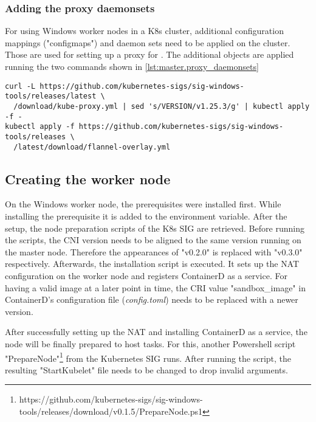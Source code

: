 \subsubsection{Adding the proxy daemonsets}
For using \ac{Windows} worker nodes in a \ac{K8s} cluster, additional configuration mappings ("configmaps") and daemon sets need to be applied on the cluster. Those are used for setting up a proxy for . The additional objects are applied running the two commands shown in \autoref{lst:master.proxy_daemonsets}
\begin{lstlisting}[label=lst:master.proxy_daemonsets, caption={Bash command for adding the flannel overlay configuration\cite{GitHubKubernetesSIGWindowsTools.20230213}}]
curl -L https://github.com/kubernetes-sigs/sig-windows-tools/releases/latest \
  /download/kube-proxy.yml | sed 's/VERSION/v1.25.3/g' | kubectl apply -f -
kubectl apply -f https://github.com/kubernetes-sigs/sig-windows-tools/releases \
  /latest/download/flannel-overlay.yml
\end{lstlisting}

\subsection{Creating the worker node}
On the Windows worker node, the prerequisites were installed first. While installing the prerequisite  it is added to the  environment variable. After the setup, the node preparation scripts of the \ac{K8s} \ac{SIG} are retrieved. Before running the scripts, the \ac{CNI} version needs to be aligned to the same version running on the master node. Therefore the appearances of "v0.2.0" is replaced with "v0.3.0" respectively.
Afterwards, the installation script is executed. It sets up the \ac{NAT} configuration on the worker node and registers ContainerD as a service.
For having a valid image at a later point in time, the \ac{CRI} value "sandbox\_image" in ContainerD's configuration file (\textit{config.toml}) needs to be replaced with a newer version.

After successfully setting up the \ac{NAT} and installing ContainerD as a service, the node will be finally prepared to host tasks. For this, another Powershell script "PrepareNode"\footnote{https://github.com/kubernetes-sigs/sig-windows-tools/releases/download/v0.1.5/PrepareNode.ps1} from the Kubernetes \ac{SIG} runs. After running the script, the resulting "StartKubelet" file needs to be changed to drop invalid arguments.

